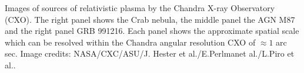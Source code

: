 \label{fig:rescomp}
Images of sources of relativistic plasma by the Chandra X-ray Observatory (CXO). The right panel shows the Crab nebula, the middle panel the AGN M87 and the right panel GRB 991216. Each panel shows the approximate spatial scale which can be resolved within the Chandra angular resolution CXO of $\approx1$ arc sec. Image credits: NASA/CXC/ASU/J. Hester et al./E.Perlmanet al./L.Piro et al..
